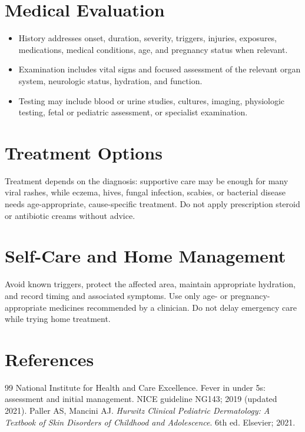 \section*{Medical Evaluation}
\begin{itemize}
  \item History addresses onset, duration, severity, triggers, injuries, exposures, medications, medical conditions, age, and pregnancy status when relevant.
  \item Examination includes vital signs and focused assessment of the relevant organ system, neurologic status, hydration, and function.
  \item Testing may include blood or urine studies, cultures, imaging, physiologic testing, fetal or pediatric assessment, or specialist examination.
\end{itemize}

\section*{Treatment Options}
Treatment depends on the diagnosis: supportive care may be enough for many viral rashes, while eczema, hives, fungal infection, scabies, or bacterial disease needs age-appropriate, cause-specific treatment. Do not apply prescription steroid or antibiotic creams without advice.

\section*{Self-Care and Home Management}
Avoid known triggers, protect the affected area, maintain appropriate hydration, and record timing and associated symptoms. Use only age- or pregnancy-appropriate medicines recommended by a clinician. Do not delay emergency care while trying home treatment.

\section*{References}
\begin{thebibliography}{99}
 National Institute for Health and Care Excellence. Fever in under 5s: assessment and initial management. NICE guideline NG143; 2019 (updated 2021).
 Paller AS, Mancini AJ. \textit{Hurwitz Clinical Pediatric Dermatology: A Textbook of Skin Disorders of Childhood and Adolescence}. 6th ed. Elsevier; 2021.
\end{thebibliography}
